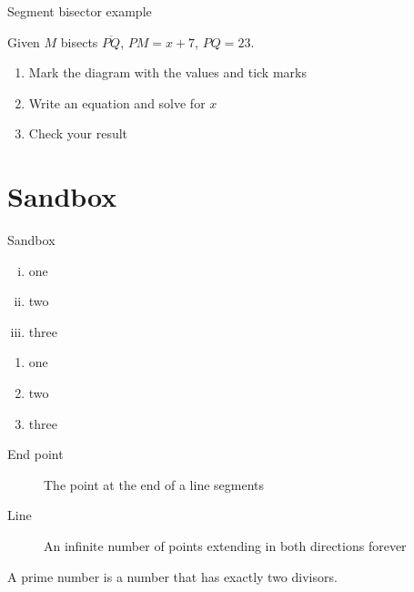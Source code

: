 \begin{frame}{Segment bisector example}
  \begin{block}{Given $M$ bisects $\overline{PQ}$, $PM=x+7$, $PQ=23$.}
    \begin{enumerate}
      \item Mark the diagram with the values and tick marks
      \item Write an equation and solve for $x$
      \item Check your result
    \end{enumerate} \vspace{0.5cm}
      \begin{center}
      \end{center}
  \end{block}
\end{frame}

\section{Sandbox}
\begin{frame}{Sandbox}
  \begin{enumerate}[(i)]
    \item one
    \item two
    \item three
  \end{enumerate}


  \begin{enumerate}[T \quad F \,]
    \item one
    \item two
    \item three
  \end{enumerate}

  \begin{description}
    \item[End point] The point at the end of a line segments
    \item[Line] An infinite number of points extending in both directions forever 
  \end{description}

  \begin{definition}
    A \alert{prime number} is a number that has exactly two divisors. 
  \end{definition}
\end{frame}

